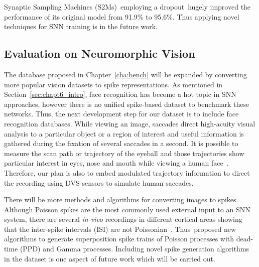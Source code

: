 Synaptic Sampling Machines (S2Ms)~\DIFdelbegin {}\DIFdelend \DIFaddbegin {}\DIFaddend employing a dropout~\DIFdelbegin {}\DIFdelend \DIFaddbegin {}\DIFaddend hugely improved the performance of its original model from 91.9\% to 95.6\%.
Thus applying novel \DIFdelbegin {}\DIFdelend \DIFaddbegin {}\DIFaddend techniques for SNN training is in the future work.


\subsection{Evaluation on Neuromorphic Vision}
The database proposed in Chapter~\ref{cha:bench} will be expanded by converting more popular vision datasets to spike representations.
As mentioned in Section~\ref{sec:chapt6_intro}, face recognition has become a hot topic in SNN approaches, however there is no unified spike-based dataset to benchmark these networks.
Thus, the next development step for our dataset is to include face recognition databases.
While viewing an image, saccades direct high-acuity visual analysis to a particular object or a region of interest and useful information is gathered during the fixation of several saccades in a second.
It is possible to measure the scan path or trajectory of the eyeball and those trajectories show particular interest in eyes, nose and mouth while viewing a human face~\DIFdelbegin {}\DIFdelend \DIFaddbegin {}\DIFaddend .
Therefore, our plan is also to embed modulated trajectory information to direct the recording using DVS sensors to simulate human saccades.

There will be more methods and algorithms for converting images to spikes.
Although Poisson spikes are the most commonly used external input to an SNN system, there are several \textit{in-vivo} recordings in different cortical areas showing that the inter-spike intervals (ISI) are not Poissonian~\DIFdelbegin {}\DIFdelend \DIFaddbegin {}\DIFaddend . 
Thus~\DIFdelbegin {}\DIFdelend \DIFaddbegin {}\DIFaddend proposed new algorithms to generate superposition spike trains of Poisson processes with dead-time (PPD) and \DIFdelbegin {}\DIFdelend Gamma processes.
Including novel spike generation algorithms in the dataset is one aspect of future work which will be carried out.

